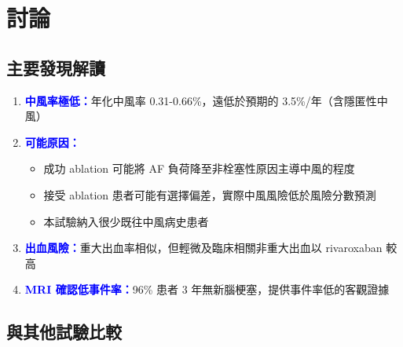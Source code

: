 \documentclass[12pt,a4paper]{article}
\begin{document}
\section{討論}

\subsection{主要發現解讀}

\begin{enumerate}
    \item \textcolor{blue}{\textbf{中風率極低：}}年化中風率 0.31-0.66\%，遠低於預期的 3.5\%/年（含隱匿性中風）

    \item \textcolor{blue}{\textbf{可能原因：}}
    \begin{itemize}
        \item 成功 ablation 可能將 AF 負荷降至非栓塞性原因主導中風的程度
        \item 接受 ablation 患者可能有選擇偏差，實際中風風險低於風險分數預測
        \item 本試驗納入很少既往中風病史患者
    \end{itemize}

    \item \textcolor{blue}{\textbf{出血風險：}}重大出血率相似，但輕微及臨床相關非重大出血以 rivaroxaban 較高

    \item \textcolor{blue}{\textbf{MRI 確認低事件率：}}96\% 患者 3 年無新腦梗塞，提供事件率低的客觀證據
\end{enumerate}

\subsection{與其他試驗比較}
\end{document}
